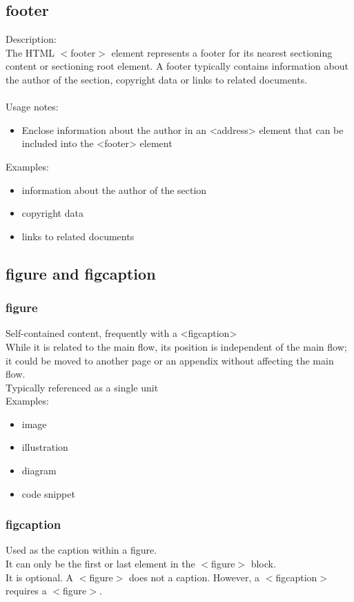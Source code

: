 \documentclass[]{article}
\begin{document}
\subsection{footer}
Description:
\\
The HTML $<$footer$>$ element represents a footer for its nearest sectioning content or sectioning root element. A footer typically contains information about the author of the section, copyright data or links to related documents.
\\\\
Usage notes:
\begin{itemize}
	\item Enclose information about the author in an <address> element that can be included into the <footer> element 
\end{itemize}
Examples:
\begin{itemize}
	\item information about the author of the section
	\item copyright data
	\item links to related documents
\end{itemize}

\subsection{figure and figcaption}
\subsubsection{figure}
Self-contained content, frequently with a <figcaption>
\\
While it is related to the main flow, its position is independent of the main flow; it could be moved to another page or an appendix without affecting the main flow. 
\\
Typically referenced as a single unit
\\
Examples:
\begin{itemize}
	\item image
	\item illustration
	\item diagram
	\item code snippet
\end{itemize}
\subsubsection{figcaption}
Used as the caption within a figure.
\\
It can only be the first or last element in the $<$figure$>$ block.
\\
It is optional.  A $<$figure$>$ does not a caption.  However, a $<$figcaption$>$ requires a $<$figure$>$.
\end{document}
